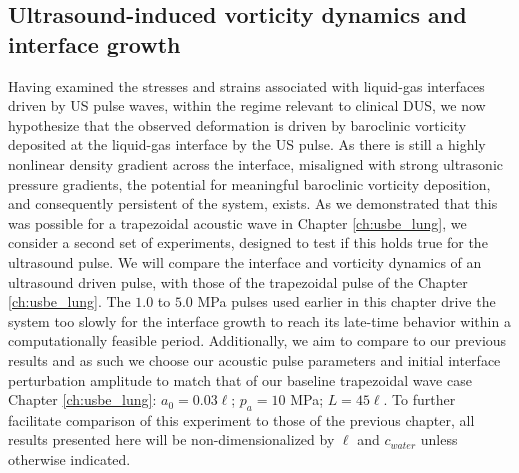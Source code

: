 \subsection{Ultrasound-induced vorticity dynamics and interface growth}
\label{subsec:vorticity_experiments}
Having examined the stresses and strains associated with liquid-gas
interfaces driven by \ac{US} pulse waves, within the regime relevant
to clinical \ac{DUS}, we now hypothesize that the observed deformation
is driven by baroclinic vorticity deposited at the liquid-gas
interface by the \ac{US} pulse. As there is still a highly nonlinear
density gradient across the interface, misaligned with strong
ultrasonic pressure gradients, the potential for meaningful baroclinic
vorticity deposition, and consequently persistent of the system,
exists. As we demonstrated that this was possible for a trapezoidal
acoustic wave in Chapter \ref{ch:usbe_lung}, we consider a second set
of experiments, designed to test if this holds true for the ultrasound
pulse. We will compare the interface and vorticity dynamics of an
ultrasound driven pulse, with those of the trapezoidal pulse of the
Chapter \ref{ch:usbe_lung}. The $1.0$ to $5.0$ MPa pulses used earlier
in this chapter drive the system too slowly for the interface growth
to reach its late-time behavior within a computationally feasible
period. Additionally, we aim to compare to our previous results and as
such we choose our acoustic pulse parameters and initial interface
perturbation amplitude to match that of our baseline trapezoidal wave
case Chapter \ref{ch:usbe_lung}: $a_0=0.03\ell$; $p_a = 10$ MPa;
$L=45\ell$. To further facilitate comparison of this experiment to
those of the previous chapter, all results presented here will be
non-dimensionalized by $\ell$ and $c_{water}$ unless otherwise
indicated.

